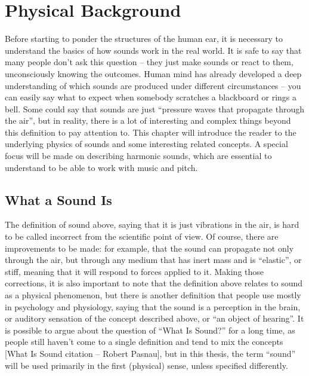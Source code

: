 \chapter{Physical Background}\label{chapter:physics}

Before starting to ponder the structures of the human ear, it is necessary to understand the basics of how sounds work in the real world. It is safe to say that many people don’t ask this question – they just make sounds or react to them, unconsciously knowing the outcomes. Human mind has already developed a deep understanding of which sounds are produced under different circumstances – you can easily say what to expect when somebody scratches a blackboard or rings a bell. Some could say that sounds are just “pressure waves that propagate through the air”, but in reality, there is a lot of interesting and complex things beyond this definition to pay attention to. This chapter will introduce the reader to the underlying physics of sounds and some interesting related concepts. A special focus will be made on describing harmonic sounds, which are essential to understand to be able to work with music and pitch.\\

\section{What a Sound Is}

The definition of sound above, saying that it is just vibrations in the air, is hard to be called incorrect from the scientific point of view. Of course, there are improvements to be made: for example, that the sound can propagate not only through the air, but through any medium that has inert mass and is “elastic”, or stiff, meaning that it will respond to forces applied to it. Making those corrections, it is also important to note that the definition above relates to sound as a physical phenomenon, but there is another definition that people use mostly in psychology and physiology, saying that the sound is a perception in the brain, or auditory sensation of the concept described above, or “an object of hearing”. It is possible to argue about the question of “What Is Sound?” for a long time, as people still haven’t come to a single definition and tend to mix the concepts [What Is Sound citation – Robert Pasnau], but in this thesis, the term “sound” will be used primarily in the first (physical) sense, unless specified differently.\\

